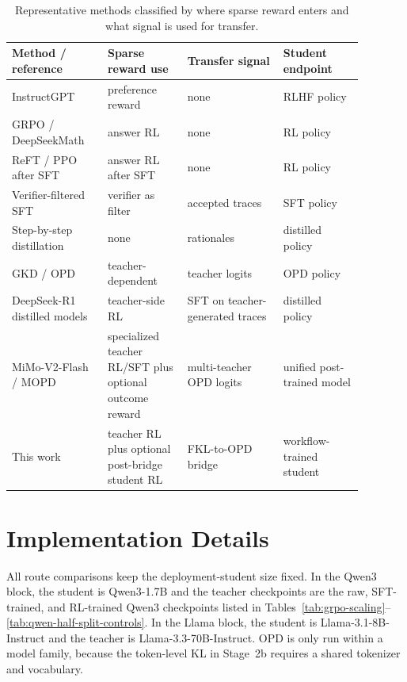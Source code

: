 \documentclass{article}
\begin{document}
\begin{table}[h]
\caption{Representative methods classified by where sparse reward enters and what signal is used for transfer.}
\label{tab:related-routes-full}
\centering
\small
\renewcommand{\arraystretch}{1.35}
\begin{tabular}{p{0.24\linewidth}p{0.20\linewidth}p{0.24\linewidth}p{0.20\linewidth}}
\toprule
Method / reference & Sparse reward use & Transfer signal & Student endpoint \\
\midrule
InstructGPT \citep{ouyang2022training} & preference reward & none & RLHF policy \\
GRPO / DeepSeekMath \citep{shao2024deepseekmath} & answer RL & none & RL policy \\
ReFT / PPO after SFT \citep{luong2024reft} & answer RL after SFT & none & RL policy \\
\addlinespace
Verifier-filtered SFT \citep{zelikman2022star,singh2024beyond} & verifier as filter & accepted traces & SFT policy \\
Step-by-step distillation \citep{fu2023specializing} & none & rationales & distilled policy \\
\addlinespace
GKD / OPD \citep{agarwal2024onpolicy} & teacher-dependent & teacher logits & OPD policy \\
DeepSeek-R1 distilled models \citep{deepseek2025r1} & teacher-side RL & SFT on teacher-generated traces & distilled policy \\
MiMo-V2-Flash / MOPD \citep{xiaomi2026mimov2flash} & specialized teacher RL/SFT plus optional outcome reward & multi-teacher OPD logits & unified post-trained model \\
\addlinespace
This work & teacher RL plus optional post-bridge student RL & FKL-to-OPD bridge & workflow-trained student \\
\bottomrule
\end{tabular}
\end{table}

\section{Implementation Details}
\label{app:implementation-notes}

All route comparisons keep the deployment-student size fixed. In the Qwen3 block, the student is Qwen3-1.7B and the teacher checkpoints are the raw, SFT-trained, and RL-trained Qwen3 checkpoints listed in Tables~\ref{tab:grpo-scaling}--\ref{tab:qwen-half-split-controls}. In the Llama block, the student is Llama-3.1-8B-Instruct and the teacher is Llama-3.3-70B-Instruct. OPD is only run within a model family, because the token-level KL in Stage~2b requires a shared tokenizer and vocabulary.
\end{document}
